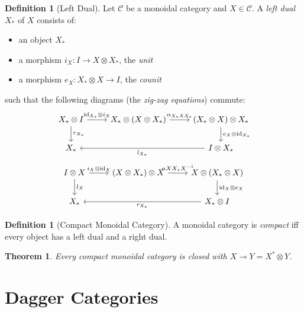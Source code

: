 \documentclass{book}
\newtheorem{thm}[lm]{Theorem}
\theoremstyle{definition}
\newtheorem{df}[lm]{Definition}
\newcommand{\id}[1]{\ensuremath{\mathrm{id}_{#1}}}
\newcommand{\inv}[1]{\ensuremath{{#1}^{-1}}}
\begin{document}
  \begin{df}[Left Dual]
    Let $\mathcal{C}$ be a monoidal category and $X \in \mathcal{C}$. A 
    \emph{left dual} $X_*$ of $X$ consists of:
    \begin{itemize}
      \item an object $X_*$
      \item a morphism $i_X : I \rightarrow X \otimes X_*$, the \emph{unit}
      \item a morphism $e_X : X_* \otimes X \rightarrow I$, the \emph{counit}
    \end{itemize}
    such that the following diagrams (the \emph{zig-zag equations}) commute:
    \[ \begin{tikzcd}
      X_* \otimes I \ar[r, "\id{X_*} \otimes i_X"] \ar[d, "r_{X_*}"] &
      X_* \otimes (X \otimes X_*) \ar[r, "\alpha_{X_*XX_*}"] &
      (X_* \otimes X) \otimes X_* \ar[d, "e_X \otimes \id{X_*}"] \\
      X_* & & I \otimes X_* \ar[ll, "l_{X_*}"]
    \end{tikzcd} \]
    \[ \begin{tikzcd}
      I \otimes X \ar[d, "l_X"] \ar[r, "i_X \otimes \id{X}"] &
      (X \otimes X_*) \otimes X \ar[r, "\inv{\alpha{XX_*X}}"] &
      X \otimes (X_* \otimes X) \ar[d, "\id{X} \otimes e_X"] \\
      X_* & & X_* \otimes I \ar[ll, "r_{X_*}"]
    \end{tikzcd}\]
    
  \end{df}
  
  \begin{df}[Compact Monoidal Category]
    A monoidal category is \emph{compact} iff every object has a left dual and 
    a 
    right dual.
  \end{df}
  
  \begin{thm}
    Every compact monoidal category is closed with $X \multimap Y = X^* \otimes 
    Y$.
  \end{thm}
  
  \section{Dagger Categories}
  
\end{document}
